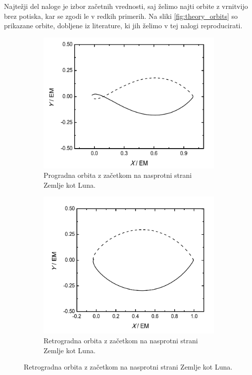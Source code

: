 \documentclass[11pt, titlepage]{article}
\begin{document}
Najtežji del naloge je izbor začetnih vrednosti, saj želimo najti orbite z vrnitvijo brez potiska, kar se zgodi le v redkih primerih.
Na sliki \ref{fig:theory_orbits} so prikazane orbite, dobljene iz literature, ki jih želimo v tej nalogi reproducirati.
\begin{figure}[h]
    \centering
    \begin{subfigure}[b]{0.45\textwidth}
        \centering
        \includegraphics[width=\textwidth]{figures/theory_orbit_1.png}
        \caption{Progradna orbita z začetkom na nasprotni strani Zemlje kot Luna.}
        \label{fig:orbit_1}
    \end{subfigure}
    \hfill
    \begin{subfigure}[b]{0.45\textwidth}
        \centering
        \includegraphics[width=\textwidth]{figures/theory_orbit_2.png}
        \caption{Retrogradna orbita z začetkom na nasprotni strani Zemlje kot Luna.}
        \label{fig:orbit_2}
    \end{subfigure}


\end{figure}
\end{document}
